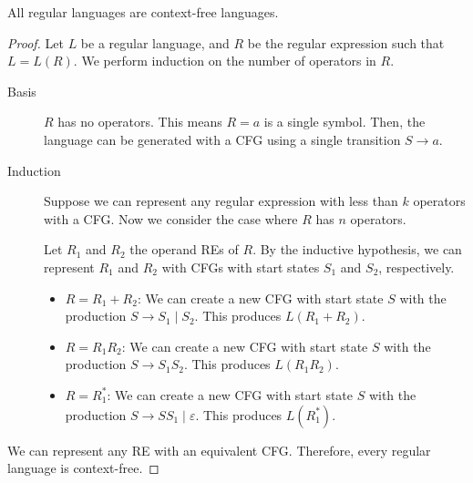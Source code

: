 \documentclass{imgs}
\begin{document}
\begin{theorem}
  All regular languages are context-free languages.
  \begin{proof}
    Let $L$ be a regular language, and $R$ be the regular expression such that $L = L(R)$.
    We perform induction on the number of operators in $R$.
    \begin{description}
      \item[Basis] $R$ has no operators. This means $R = a$ is a single symbol.
            Then, the language can be generated with a CFG using a single transition $S \to a$.
      \item[Induction]
            Suppose we can represent any regular expression with less than $k$ operators with a CFG.
            Now we consider the case where $R$ has $n$ operators.

            Let $R_1$ and $R_2$ the operand REs of $R$.
            By the inductive hypothesis, we can represent $R_1$ and $R_2$ with CFGs with start states $S_1$ and $S_2$, respectively.

            \begin{itemize}
              \item $R = R_1 + R_2$:
                    We can create a new CFG with start state $S$ with the production $S \to S_1 \mid S_2$.
                    This produces $L(R_1 + R_2)$.
              \item $R = R_1 R_2$:
                    We can create a new CFG with start state $S$ with the production $S \to S_1 S_2$.
                    This produces $L(R_1 R_2)$.
              \item $R = R_1^*$:
                    We can create a new CFG with start state $S$ with the production $S \to S S_1 \mid \varepsilon$.
                    This produces $L(R_1^*)$.
            \end{itemize}
    \end{description}
    We can represent any RE with an equivalent CFG.
    Therefore, every regular language is context-free.
  \end{proof}
\end{theorem}
\end{document}
